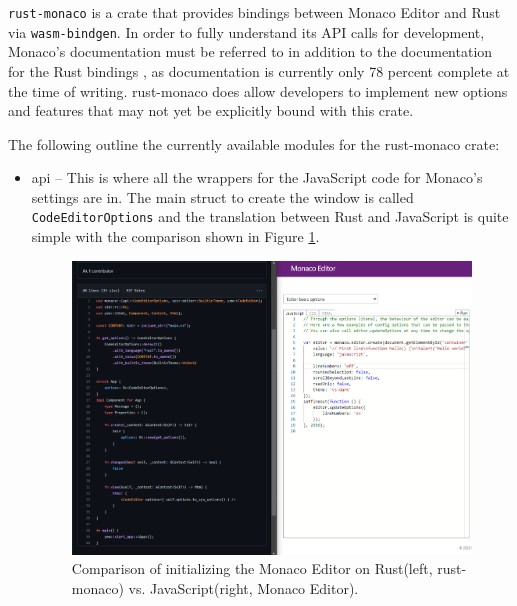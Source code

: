 \documentclass[
    paper=letter,
    parskip=half,
    fontsize=12pt,
    titlepage=firstiscover,
    toc=bibliography,
    numbers=endperiod
]{scrartcl}
\providecommand{\tightlist}{%
  \setlength{\itemsep}{0pt}\setlength{\parskip}{0pt}}
\begin{document}
\texttt{rust-monaco} \cite{rust-monaco} is a crate that provides
bindings between Monaco Editor and Rust via \texttt{wasm-bindgen}. In
order to fully understand its API calls for development, Monaco's
documentation must be referred to in addition to the documentation for
the Rust bindings \cite{rust-monaco-docs}, as documentation is currently
only 78 percent complete at the time of writing. rust-monaco does allow
developers to implement new options and features that may not yet be
explicitly bound with this crate.

The following outline the currently available modules for the
rust-monaco crate:

\begin{itemize}
    \tightlist
    \item api -- This is where all the wrappers for the JavaScript code for
          Monaco's settings are in. The main struct to create the window is called
          \texttt{CodeEditorOptions} and the translation between Rust and
          JavaScript is quite simple with the comparison shown in Figure
          \ref{fig:monaco-initialize}.

          \begin{figure}[H]
              \includegraphics[width=\textwidth]{monaco-initialize}
              \caption{Comparison of initializing the Monaco Editor on Rust(left, rust-monaco) vs. JavaScript(right, Monaco Editor).}
              \label{fig:monaco-initialize}
          \end{figure}


\end{itemize}
\end{document}
